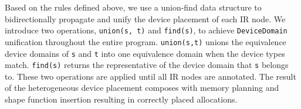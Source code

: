 Based on the rules defined above, we use a union-find data structure to bidirectionally propagate and unify the device placement of each IR node. We introduce two operations, \texttt{union(s, t)} and \texttt{find(s)}, to achieve \texttt{DeviceDomain} unification throughout the entire program. \texttt{union(s,t)} unions the equivalence device domains of \texttt{s} and \texttt{t} into one equivalence domain when the device types match. \texttt{find(s)} returns the representative of the device domain that \texttt{s} belongs to. These two operations are applied until all IR nodes are annotated. The result of the heterogeneous device placement composes with memory planning and shape function insertion resulting in correctly placed allocations.




